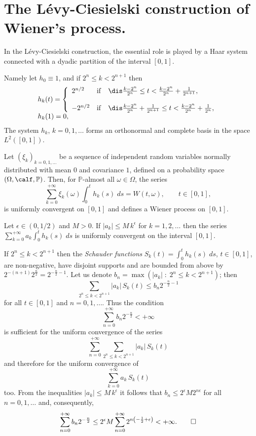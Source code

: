 \documentclass[preprint]{imsart}
\def\P{\mathbb P}
\begin{document}
{\section{The L\'evy-Ciesielski construction of Wiener's process.}

In the L\'evy-Ciesielski construction, the essential role
is played by a Haar system connected with a dyadic partition
of the interval $[0,1]$.

Namely let $h_0\equiv 1$, and if $2^n\leq k<2^{n+1}$ then
$$
\begin{array}{l}
h_k(t)=\left\{
\begin{array}{lll}
2^{n/2} &{\rm if}&\dis
\frac{k-2^n}{2^n}\leq t < \frac{k-2^n}{2^n}+\frac{1}{2^{n+1}},
\\\\
-2^{n/2} &{\rm if}&\dis
\frac{k-2^n}{2^n}+\frac{1}{2^{n+1}}
\leq t < \frac{k-2^n}{2^n}+\frac{1}{2^{n}},
\end{array}
\right.
\\
h_k(1)=0,
\end{array}
$$
The system $h_k$, $k=0,1,\ldots$ forms an orthonormal and complete
basis in the space $L^2([0,1])$.

\begin{Theorem}
Let $(\xi_k)_{k=0,1,\ldots}$ be a sequence of independent random
variables normally distributed with mean $0$ and covariance $1$,
defined on a probability space $(\Omega, \calf, \P)$. Then,
for $\P$-almost all $\omega \in \Omega $, the series
$$
\sum_{k=0}^{+\infty}\xi_k(\omega)\int_0^th_k(s)\; ds
=W(t,\omega),\qquad t\in [0,1],
$$
is uniformly convergent on $[0,1]$ and defines a Wiener
process on $[0,1]$.
\end{Theorem}


\begin{Lemma}\label{levycieuno}
Let $\epsilon\in (0,1/2)$ and $M>0$. If $|a_k|\leq M\, k^\epsilon$
for $k=1,2,\ldots$ then the series
$\sum_{k=0}^{+\infty}a_k\int_0^th_k(s)\; ds$ is
uniformly convergent on the interval $[0,1]$.
\end{Lemma}

If $2^n\le k<2^{n+1}$ then the {\em Schauder functions}
$S_k(t)=\int_0^th_k(s)\; ds$, $t\in [0,1]$, are non-negative, have
disjoint supports and are bounded from above by
$2^{-(n+1)}2^\frac{n}{2}= 2^{-\frac{n}{2}-1}$. Let us denote
$b_n= \max(|a_k|\; :\; 2^n\le k<2^{n+1})$; then
$$
\sum_{2^n\le k<2^{n+1}} |a_k|\, S_k(t)\le
b_n 2^{-\frac{n}{2}-1}
$$
for all $t\in [0,1]$ and $n=0,1,\ldots$. Thus the condition
$$
\sum_{n=0}^{+\infty}b_n 2^{-\frac{n}{2}}<+\infty
$$
is sufficient for the uniform convergence of the series
$$
\sum_{n=0}^{+\infty}\sum_{2^n\le k<2^{n+1}} |a_k|\, S_k(t)
$$
and therefore for the uniform convergence of
$$
\sum_{k=0}^{+\infty}a_k\, S_k(t)
$$
too. From the inequalities $|a_k|\leq M\, k^\epsilon$
it follows that $b_n\le 2^\epsilon M 2^{n\epsilon}$ for all
$n=0,1,\ldots$ and, consequently,
$$
\sum_{n=0}^{+\infty}b_n 2^{-\frac{n}{2}}
\le 2^\epsilon M \sum_{n=0}^{+\infty} 2^{n\left(
-\frac{1}{2}+\epsilon\right)} <+\infty.
\qed
$$


}
\end{document}
